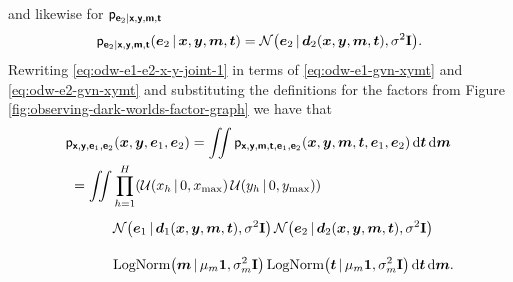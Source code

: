 and likewise for $\mathsf{p}_{\boldsymbol{\mathsf{e}}_2 | \boldsymbol{\mathsf{x}},\boldsymbol{\mathsf{y}},\boldsymbol{\mathsf{m}},\boldsymbol{\mathsf{t}}}$
\begin{equation}\label{eq:odw-e2-gvn-xymt}
  \pden{\rvct{e}_2 | \rvct{x},\rvct{y},\rvct{m},\rvct{t}}(\vct{e}_2\gvn\vct{x},\vct{y},\vct{m},\vct{t})
  =
  \nrm{\vct{e}_2 \gvn \vct{d}_2(\vct{x},\vct{y},\vct{m},\vct{t}),\sigma^2\mathbf{I}}.
\end{equation}
Rewriting \eqref{eq:odw-e1-e2-x-y-joint-1} in terms of \eqref{eq:odw-e1-gvn-xymt} and \eqref{eq:odw-e2-gvn-xymt} and substituting the definitions for the factors from Figure \ref{fig:observing-dark-worlds-factor-graph} we have that
\begin{equation}\label{eq:odw-e1-e2-x-y-joint-2}
\begin{split}
  &\pden{\rvct{x},\rvct{y},\rvct{e}_1,\rvct{e}_2}(\vct{x},\vct{y},\vct{e}_1,\vct{e}_2) =
  \iint 
    \pden
      {\rvct{x},\rvct{y},\rvct{m},\rvct{t},\rvct{e}_1,\rvct{e}_2}
      (\vct{x},\vct{y},\vct{m},\vct{t},\vct{e}_1,\vct{e}_2)
   \,\dr\vct{t}\,\dr\vct{m}
  \\
  &
  ~=\iint
  \prod_{h=1}^H \lpa 
    \mathcal{U}\lpa x_h \gvn 0,x_{\textrm{max}}\rpa \,
    \mathcal{U}\lpa y_h \gvn 0,y_{\textrm{max}}\rpa 
  \rpa 
  \\
  &
  \phantom{~=\iint}~
    \nrm{\vct{e}_1 \gvn \vct{d}_1(\vct{x},\vct{y},\vct{m},\vct{t}),\sigma^2\mathbf{I}}\,
    \nrm{\vct{e}_2 \gvn \vct{d}_2(\vct{x},\vct{y},\vct{m},\vct{t}),\sigma^2\mathbf{I}}
  \\
  &\phantom{~=\iint}~
    \textrm{LogNorm}\lpa \vct{m} \gvn \mu_m\vct{1}, \sigma_m^2\mathbf{I} \rpa \, 
    \textrm{LogNorm}\lpa \vct{t} \gvn \mu_m\vct{1}, \sigma_m^2\mathbf{I} \rpa
  \,\dr\vct{t}\,\dr\vct{m}.
\end{split}
\end{equation}
